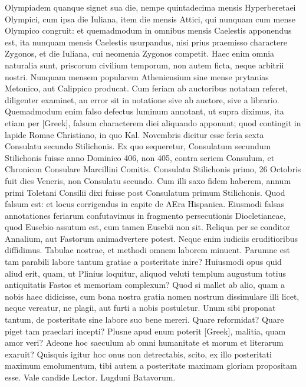 Olympiadem quanque signet sua die,
nempe quintadecima mensis Hyperberetaei Olympici, cum ipsa die
Iuliana, item die mensis Attici, qui nunquam cum mense Olympico
congruit: et quemadmodum in omnibus mensis Caelestis apponendus
est, ita nunquam mensis Caelestis usurpandus, nisi prius praemisso charactere
Zygonos, et die Iuliana, cui neomenia Zygonos competit.
Haec enim omnia naturalia sunt, priscorum civilium temporum, non
autem ficta, neque arbitrii nostri.
Nunquam mensem popularem Atheniensium
sine mense prytanias Metonico, aut Calippico producat.
Cum feriam ab auctoribus notatam referet, diligenter examinet, an
error sit in notatione sive ab auctore, sive a librario.
Quemadmodum
enim falso defectus luminum annotant, ut supra diximus, ita etiam
per \textgreek{[Greek]}, falsum characterem diei aliquando apponunt;
 quod contingit
in lapide Romae Christiano, in quo  Kal. Novembris dicitur
esse feria sexta Consulatu secundo Stilichonis.
Ex quo sequeretur, Consulatum
secundum Stilichonis fuisse anno Dominico 406, non 405,
contra seriem Consulum, et Chronicon Consulare Marcillini Comitis.
Consulatu Stilichonis primo, 26 Octobris fuit dies Veneris,
non Consulatu secundo.
Cum illi saxo fidem haberem, annum primi
Toletani Consilii dixi fuisse post Consulatum primum Stilichonis.
Quod falsum est: et locus corrigendus in capite de AEra Hispanica.
Eiusmodi falsas annotationes feriarum confutavimus in fragmento
persecutionis Diocletianeae, quod Eusebio assutum est, cum tamen
Eusebii non sit.
Reliqua per se conditor Annalium, aut Fastorum animadvertere
potest.
Neque enim iudiciis eruditioribus diffidimus.
Tabulae nostrae, et methodi omnem laborem minuent.
Parumne est
tam parabili labore tantum gratiae a posteritate inire?
Huiusmodi
opus quid aliud erit, quam, ut Plinius loquitur, aliquod veluti templum
augustum totius antiquitatis Fastos et memoriam complexum?
Quod si mallet ab alio, quam a nobis haec didicisse, cum bona nostra
gratia nomen nostrum dissimulare illi licet, neque vereatur, ne
plagii, aut furti a nobis postuletur.
Unum sibi proponat tantum, de
posteritate sine labore suo bene mereri.
Quare reformidat?
Quare piget tam praeclari incepti?
Plusne apud enum poterit \textgreek{[Greek]}, malitia,
quam amor veri?
Adeone hoc saeculum ab omni humanitate et
morum et literarum exaruit?
Quisquis igitur hoc onus non detrectabis,
scito, ex illo posteritati maximum emolumentum, tibi autem
a posteritate maximam gloriam propositam esse.
Vale candide
Lector.
Lugduni Batavorum.
%
